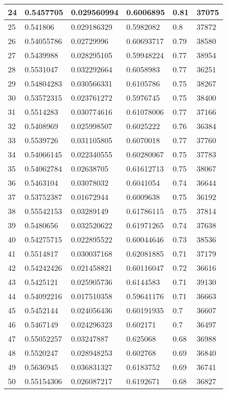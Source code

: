 \begin{longtable}{|l|l|l|l|l|l|}
24 & 0.5457705 & 0.029560994 & 0.6006895 & 0.81 & 37075 \\ \hline 
25 & 0.541806 & 0.029186329 & 0.5982082 & 0.8 & 37872 \\ \hline 
26 & 0.54055786 & 0.02729996 & 0.60693717 & 0.79 & 38580 \\ \hline 
27 & 0.5439988 & 0.028295105 & 0.59948224 & 0.77 & 38954 \\ \hline 
28 & 0.5531047 & 0.032292664 & 0.6058983 & 0.77 & 36251 \\ \hline 
29 & 0.54804283 & 0.030566331 & 0.6105786 & 0.75 & 38267 \\ \hline 
30 & 0.53572315 & 0.023761272 & 0.5976745 & 0.75 & 38400 \\ \hline 
31 & 0.5514283 & 0.030774616 & 0.61078006 & 0.77 & 37166 \\ \hline 
32 & 0.5408969 & 0.025998507 & 0.6025222 & 0.76 & 36384 \\ \hline 
33 & 0.5539726 & 0.031105805 & 0.6070018 & 0.77 & 37760 \\ \hline 
34 & 0.54066145 & 0.022340555 & 0.60280067 & 0.75 & 37783 \\ \hline 
35 & 0.54062784 & 0.02638705 & 0.61612713 & 0.75 & 38067 \\ \hline 
36 & 0.5463104 & 0.03078032 & 0.6041054 & 0.74 & 36644 \\ \hline 
37 & 0.53752387 & 0.01672944 & 0.6009638 & 0.75 & 36192 \\ \hline 
38 & 0.55542153 & 0.03289149 & 0.61786115 & 0.75 & 37814 \\ \hline 
39 & 0.5480656 & 0.032520622 & 0.61971265 & 0.74 & 37638 \\ \hline 
40 & 0.54275715 & 0.022895522 & 0.60044646 & 0.73 & 38536 \\ \hline 
41 & 0.5514817 & 0.030037168 & 0.62081885 & 0.71 & 37179 \\ \hline 
42 & 0.54242426 & 0.021458821 & 0.60116047 & 0.72 & 36616 \\ \hline 
43 & 0.5425121 & 0.025905736 & 0.6144583 & 0.71 & 39130 \\ \hline 
44 & 0.54092216 & 0.017510358 & 0.59641176 & 0.71 & 36663 \\ \hline 
45 & 0.5452144 & 0.024056436 & 0.60191935 & 0.7 & 36607 \\ \hline 
46 & 0.5467149 & 0.024296323 & 0.602171 & 0.7 & 36497 \\ \hline 
47 & 0.55052257 & 0.03247887 & 0.625068 & 0.68 & 36988 \\ \hline 
48 & 0.5520247 & 0.028948253 & 0.602768 & 0.69 & 36840 \\ \hline 
49 & 0.5636945 & 0.036831327 & 0.6183752 & 0.69 & 36741 \\ \hline 
50 & 0.55154306 & 0.026087217 & 0.6192671 & 0.68 & 36827 \\ \hline 
\end{longtable}
